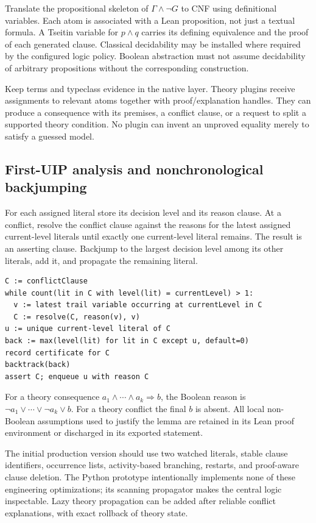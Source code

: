 \documentclass[11pt,letterpaper]{article}
\theoremstyle{definition}\newtheorem{definition}[proposition]{Definition}
\begin{document}
Translate the propositional skeleton of $\Gamma\land\neg G$ to CNF using definitional variables. Each atom is associated with a Lean proposition, not just a textual formula. A Tseitin variable for $p\land q$ carries its defining equivalence and the proof of each generated clause. Classical decidability may be installed where required by the configured logic policy. Boolean abstraction must not assume decidability of arbitrary propositions without the corresponding construction.

Keep terms and typeclass evidence in the native layer. Theory plugins receive assignments to relevant atoms together with proof/explanation handles. They can produce a consequence with its premises, a conflict clause, or a request to split a supported theory condition. No plugin can invent an unproved equality merely to satisfy a guessed model.

\subsection{First-UIP analysis and nonchronological backjumping}
For each assigned literal store its decision level and its reason clause. At a conflict, resolve the conflict clause against the reasons for the latest assigned current-level literals until exactly one current-level literal remains. The result is an asserting clause. Backjump to the largest decision level among its other literals, add it, and propagate the remaining literal.

\begin{lstlisting}
C := conflictClause
while count(lit in C with level(lit) = currentLevel) > 1:
  v := latest trail variable occurring at currentLevel in C
  C := resolve(C, reason(v), v)
u := unique current-level literal of C
back := max(level(lit) for lit in C except u, default=0)
record certificate for C
backtrack(back)
assert C; enqueue u with reason C
\end{lstlisting}

For a theory consequence $a_1\land\cdots\land a_k\Rightarrow b$, the Boolean reason is $\neg a_1\lor\cdots\lor\neg a_k\lor b$. For a theory conflict the final $b$ is absent. All local non-Boolean assumptions used to justify the lemma are retained in its Lean proof environment or discharged in its exported statement.

The initial production version should use two watched literals, stable clause identifiers, occurrence lists, activity-based branching, restarts, and proof-aware clause deletion. The Python prototype intentionally implements none of these engineering optimizations; its scanning propagator makes the central logic inspectable. Lazy theory propagation can be added after reliable conflict explanations, with exact rollback of theory state.
\end{document}
